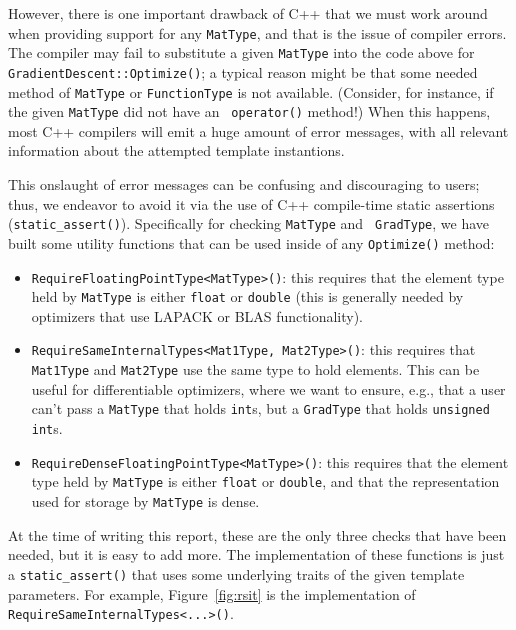 However, there is one important drawback of C++ that we must work around when
providing support for any {\tt MatType}, and that is the issue of compiler
errors.  The compiler may fail to substitute a given {\tt MatType} into the
code above for {\tt GradientDescent::Optimize()}; a typical reason might be that
some needed method of {\tt MatType} or {\tt FunctionType} is not available.
(Consider, for instance, if the given {\tt MatType} did not have an {\tt
operator\*()} method!)  When this happens, most C++ compilers will emit a huge
amount of error messages, with all relevant information about the attempted
template instantions.

This onslaught of error messages can be confusing and discouraging to users;
thus, we endeavor to avoid it via the use of C++ compile-time static assertions
({\tt static\_assert()}).  Specifically for checking {\tt MatType} and {\tt
GradType}, we have built some utility functions that can be used inside of any
{\tt Optimize()} method:

\begin{itemize}
  \item {\tt RequireFloatingPointType<MatType>()}: this requires that the
element type held by {\tt MatType} is either {\tt float} or {\tt double} (this
is generally needed by optimizers that use LAPACK or BLAS functionality).

  \item {\tt RequireSameInternalTypes<Mat1Type, Mat2Type>()}: this requires that
{\tt Mat1Type} and {\tt Mat2Type} use the same type to hold elements.  This can
be useful for differentiable optimizers, where we want to ensure, e.g., that a
user can't pass a {\tt MatType} that holds {\tt int}s, but a {\tt GradType} that
holds {\tt unsigned int}s.

  \item {\tt RequireDenseFloatingPointType<MatType>()}: this requires that the
element type held by {\tt MatType} is either {\tt float} or {\tt double}, and
that the representation used for storage by {\tt MatType} is dense.
\end{itemize}

At the time of writing this report, these are the only three checks that have
been needed, but it is easy to add more.  The implementation of these functions
is just a {\tt static\_assert()} that uses some underlying traits of the given
template parameters.  For example, Figure~\ref{fig:rsit} is the implementation
of {\tt RequireSameInternalTypes<...>()}.


